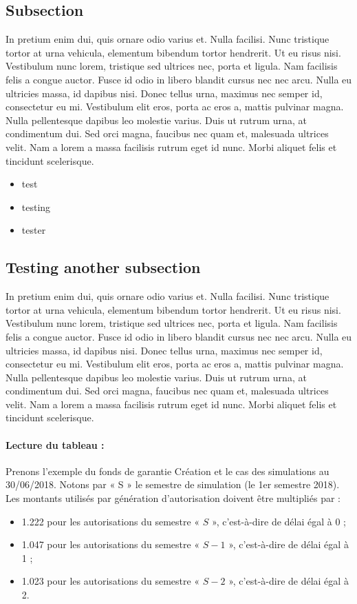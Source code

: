 \documentclass[11pt,a4paper]{report}
\begin{document}
\subsection{Subsection}

In pretium enim dui, quis ornare odio varius et. Nulla facilisi. Nunc tristique tortor at urna vehicula, elementum bibendum tortor hendrerit. Ut eu risus nisi. Vestibulum nunc lorem, tristique sed ultrices nec, porta et ligula. Nam facilisis felis a congue auctor. Fusce id odio in libero blandit cursus nec nec arcu. Nulla eu ultricies massa, id dapibus nisi. Donec tellus urna, maximus nec semper id, consectetur eu mi. Vestibulum elit eros, porta ac eros a, mattis pulvinar magna. Nulla pellentesque dapibus leo molestie varius. Duis ut rutrum urna, at condimentum dui. Sed orci magna, faucibus nec quam et, malesuada ultrices velit. Nam a lorem a massa facilisis rutrum eget id nunc. Morbi aliquet felis et tincidunt scelerisque. 

\begin{itemize}
    \item test
    \item testing
\item tester
\end{itemize}

\subsection{Testing another subsection}

In pretium enim dui, quis ornare odio varius et. Nulla facilisi. Nunc tristique tortor at urna vehicula, elementum bibendum tortor hendrerit. Ut eu risus nisi. Vestibulum nunc lorem, tristique sed ultrices nec, porta et ligula. Nam facilisis felis a congue auctor. Fusce id odio in libero blandit cursus nec nec arcu. Nulla eu ultricies massa, id dapibus nisi. Donec tellus urna, maximus nec semper id, consectetur eu mi. Vestibulum elit eros, porta ac eros a, mattis pulvinar magna. Nulla pellentesque dapibus leo molestie varius. Duis ut rutrum urna, at condimentum dui. Sed orci magna, faucibus nec quam et, malesuada ultrices velit. Nam a lorem a massa facilisis rutrum eget id nunc. Morbi aliquet felis et tincidunt scelerisque. 

\paragraph{Lecture du tableau :} 
Prenons l’exemple du fonds de garantie Création et le cas des simulations au 30/06/2018. Notons par « S » le semestre de simulation (le 1er semestre 2018). Les montants utilisés par génération d’autorisation doivent être multipliés par :
\begin{itemize}
    \item 1.222 pour les autorisations du semestre « $S$ », c’est-à-dire de délai égal à 0 ;
    \item 1.047 pour les autorisations du semestre « $S -1$ », c’est-à-dire de délai égal à 1 ;
    \item 1.023 pour les autorisations du semestre « $S-2$ », c’est-à-dire de délai égal à 2.
\end{itemize}
\end{document}
